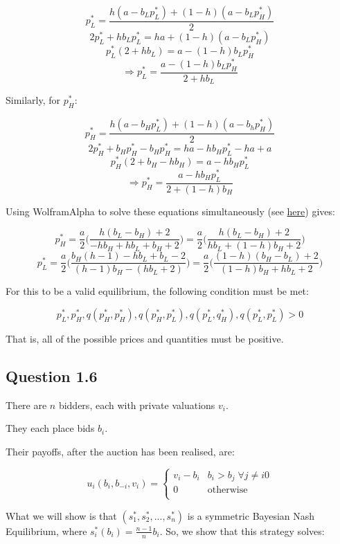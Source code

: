 \documentclass[11pt,a4paper]{article}
\begin{document}
$$p_L^* = \frac{h(a-b_L p_L^*)+(1-h)(a-b_Lp_H^*)}{2}$$
$$2p_L^* + hb_Lp_L^* = ha+(1-h)(a-b_Lp_H^*)$$
$$p_L^*(2+hb_L) = a-(1-h)b_Lp_H^*$$
$$ \Rightarrow p_L^* = \frac{a-(1-h)b_Lp_H^*}{2+hb_L} $$

Similarly, for $p_H^*$:

$$p_H^* = \frac{h(a-b_Hp_L^*)+(1-h)(a-b_hp_H^*)}{2} $$
$$ 2p_H^* +b_Hp_H^* - b_Hp_H^* = ha-hb_Hp_L^*-ha+a$$
$$ p_H^*(2+b_H-hb_H) = a - hb_Hp_L^* $$
$$ \Rightarrow p_H^* = \frac{a-hb_Hp_L^*}{2+(1-h)b_H} $$

Using WolframAlpha to solve these equations simultaneously (see \href{https://bit.ly/2TFDSfE}{here}) gives:

$$p_H^* = \frac{a}{2}\Big( \frac{h(b_L-b_H)+2}{-hb_H+hb_L+b_H+2} \Big) = \frac{a}{2} \Big( \frac{h(b_L-b_H)+2}{hb_L+(1-h)b_H+2} \Big)$$
$$p_L^* = \frac{a}{2}\Big( \frac{b_H(h-1)-hb_L+b_L-2}{(h-1)b_H-(hb_L+2)} \Big) = \frac{a}{2}\Big( \frac{(1-h)(b_H-b_L)+2}{(1-h)b_H +hb_L + 2} \Big)$$

For this to be a valid equilibrium, the following condition must be met:

$$p_L^*, p_H^*, q(p_H^*, p_H^*), q(p_H^*,p_L^*), q(p_L^*, q_H^*), q(p_L^*, p_L^*) > 0$$

That is, all of the possible prices and quantities must be positive. 

\subsection*{Question 1.6}

There are $n$ bidders, each with private valuations $v_i$.

They each place bids $b_i$.

Their payoffs, after the auction has been realised, are:

$$u_i(b_i,b_{-i}, v_i) =  \begin{cases} 
      v_i-b_i & b_i>b_j \; \forall j \neq i 0 \\
      0 & \text{otherwise} \\
   \end{cases}
$$

What we will show is that $(s_1^*, s_2^*, ..., s_n^*)$ is a symmetric Bayesian Nash Equilibrium, where $s_i^*(b_i) = \frac{n-1}{n}b_i$. So, we show that this strategy solves:
\end{document}
